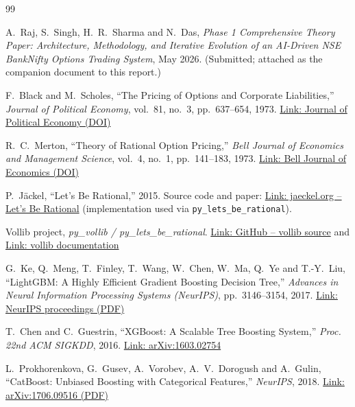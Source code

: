 \documentclass[11pt,a4paper]{article}
\newcommand{\code}[1]{\texttt{#1}}
\begin{document}
\begin{thebibliography}{99}

 A.~Raj, S.~Singh, H.~R.~Sharma and N.~Das,
\emph{Phase 1 Comprehensive Theory Paper: Architecture, Methodology, and Iterative
Evolution of an AI-Driven NSE BankNifty Options Trading System}, May 2026.
(Submitted; attached as the companion document to this report.)

 F.~Black and M.~Scholes,
``The Pricing of Options and Corporate Liabilities,''
\emph{Journal of Political Economy}, vol.~81, no.~3, pp.~637--654, 1973.
\href{https://doi.org/10.1086/260062}{Link: Journal of Political Economy (DOI)}

 R.~C.~Merton,
``Theory of Rational Option Pricing,''
\emph{Bell Journal of Economics and Management Science}, vol.~4, no.~1, pp.~141--183, 1973.
\href{https://doi.org/10.2307/3003143}{Link: Bell Journal of Economics (DOI)}

 P.~J\"ackel, ``Let's Be Rational,'' 2015.
Source code and paper: \href{http://www.jaeckel.org/}{Link: jaeckel.org -- Let's Be Rational}
(implementation used via \code{py\_lets\_be\_rational}).

 Vollib project, \emph{py\_vollib / py\_lets\_be\_rational}.
\href{https://github.com/vollib/py_lets_be_rational}{Link: GitHub -- vollib source} and
\href{https://vollib.org/documentation/python/0.1.5/}{Link: vollib documentation}

 G.~Ke, Q.~Meng, T.~Finley, T.~Wang, W.~Chen, W.~Ma, Q.~Ye and
T.-Y.~Liu, ``LightGBM: A Highly Efficient Gradient Boosting Decision Tree,''
\emph{Advances in Neural Information Processing Systems (NeurIPS)}, pp.~3146--3154, 2017.
\href{https://proceedings.neurips.cc/paper/2017/file/6449f44a102fde848669bdd9eb6b76fa-Paper.pdf}{Link: NeurIPS proceedings (PDF)}

 T.~Chen and C.~Guestrin, ``XGBoost: A Scalable Tree Boosting System,''
\emph{Proc. 22nd ACM SIGKDD}, 2016. \href{https://arxiv.org/abs/1603.02754}{Link: arXiv:1603.02754}

 L.~Prokhorenkova, G.~Gusev, A.~Vorobev, A.~V.~Dorogush and A.~Gulin,
``CatBoost: Unbiased Boosting with Categorical Features,''
\emph{NeurIPS}, 2018. \href{https://arxiv.org/pdf/1706.09516}{Link: arXiv:1706.09516 (PDF)}


\end{thebibliography}
\end{document}
